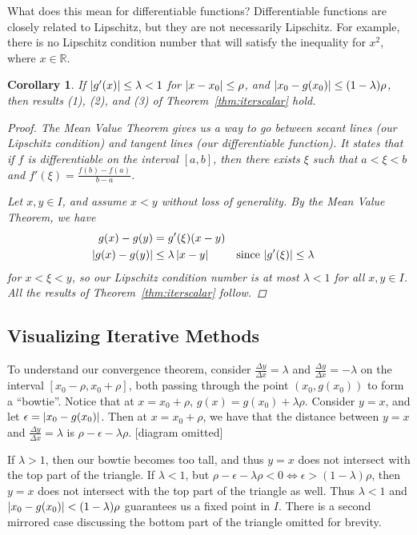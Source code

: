 \documentclass[12pt,letterpaper,DIV=11]{scrartcl}
\theoremstyle{plain}
\newtheorem{corollary}{Corollary}
\theoremstyle{definition}
\theoremstyle{remark}
\begin{document}
What does this mean for differentiable functions?
Differentiable functions are closely related to Lipschitz, but they are not necessarily Lipschitz.
For example, there is no Lipschitz condition number that will satisfy the inequality for $x^2$, where $x \in \mathbb{R}$.
\begin{corollary}\label{cor:iterscalar}
  If $\left\lvert g'(x)\right\rvert \leq \lambda < 1$ for $\left\lvert x - x_0\right\rvert \leq \rho$, and $\left\lvert x_0 - g(x_0)\right\rvert \leq (1 - \lambda) \rho$, then results (1), (2), and (3) of Theorem~\ref{thm:iterscalar} hold.
  \begin{proof}
    The Mean Value Theorem gives us a way to go between secant lines (our Lipschitz condition) and tangent lines (our differentiable function).
    It states that if $f$ is differentiable on the interval $[a, b]$, then there exists $\xi$ such that $a < \xi < b$ and $f'(\xi) = \frac{f(b) - f(a)}{b - a}$.

    Let $x, y \in I$, and assume $x < y$ without loss of generality.
    By the Mean Value Theorem, we have \begin{align*}
      g(x) - g(y) &= g'(\xi)(x - y) \\
      \left\lvert g(x) - g(y)\right\rvert &\leq \lambda \left\lvert x - y\right\rvert && \text{since $\left\lvert g'(\xi)\right\rvert \leq \lambda$}
    \end{align*} for $x < \xi < y$, so our Lipschitz condition number is at most $\lambda < 1$ for all $x, y \in I$.
    All the results of Theorem~\ref{thm:iterscalar} follow.
  \end{proof}
\end{corollary}

\subsection{Visualizing Iterative Methods}
To understand our convergence theorem, consider $\frac{\Delta y}{\Delta x} = \lambda$ and $\frac{\Delta y}{\Delta x} = - \lambda$ on the interval $[x_0 - \rho, x_0 + \rho]$, both passing through the point $(x_0, g(x_0))$ to form a \enquote{bowtie}.
Notice that at $x = x_0 + \rho$, $g(x) = g(x_0) + \lambda \rho$.
Consider $y = x$, and let $\epsilon = \left\lvert x_0 - g(x_0)\right\rvert$.
Then at $x = x_0 + \rho$, we have that the distance between $y = x$ and $\frac{\Delta y}{\Delta x} = \lambda$ is $\rho - \epsilon - \lambda \rho$.
[diagram omitted] %

If $\lambda > 1$, then our bowtie becomes too tall, and thus $y = x$ does not intersect with the top part of the triangle.
If $\lambda < 1$, but $\rho - \epsilon - \lambda \rho < 0 \iff \epsilon > (1 - \lambda) \rho$, then $y = x$ does not intersect with the top part of the triangle as well.
  Thus $\lambda < 1$ and $\left\lvert x_0 - g(x_0)\right\rvert < (1 - \lambda) \rho$ guarantees us a fixed point in $I$.
  There is a second mirrored case discussing the bottom part of the triangle omitted for brevity.
\end{document}
